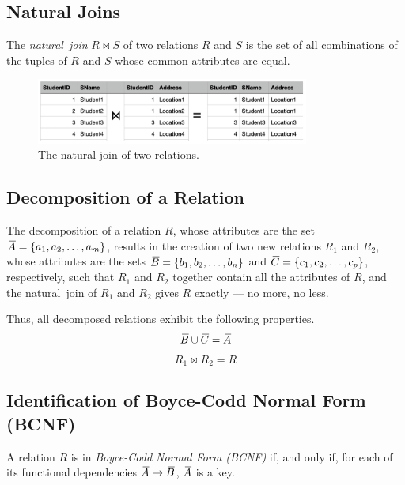 \subsection{Natural Joins}

The \emph{natural~join} \( R \bowtie S \) of two relations \( R \) and \( S \) is the set of all combinations of the tuples of \( R \) and \( S \) whose common attributes are equal.

\begin{figure}[htp]
  \centering
  \includegraphics[width=0.8\textwidth]{unit-3/figures/natural-join.jpg}
  \caption*{The natural join of two relations.}
\end{figure}

\subsection{Decomposition of a Relation}

The decomposition of a relation \( R \), whose attributes are the set \( {}\mkern3mu\overline{\mkern-3muA} = \left\{ a_1, a_2, \ldots, a_m \right\} \), results in the creation of two new relations \( R_1 \) and \( R_2 \), whose attributes are the sets \( {}\mkern3mu\overline{\mkern-3muB} = \left\{ b_1, b_2, \ldots, b_n \right\} \) and \( {}\mkern3mu\overline{\mkern-3muC} = \left\{ c_1, c_2, \ldots, c_p \right\} \), respectively, such that \( R_1 \) and \( R_2 \) together contain all the attributes of \( R \), and the natural~join of \( R_1 \) and \( R_2 \) gives \( R \) exactly --- no more, no less.

Thus, all decomposed relations exhibit the following properties.
\begin{equation*}
  {}\mkern3mu\overline{\mkern-3muB} \cup {}\mkern3mu\overline{\mkern-3muC} = {}\mkern3mu\overline{\mkern-3muA}
\end{equation*}
\begin{equation*}
  R_1 \bowtie R_2 = R
\end{equation*}

\subsection{Identification of Boyce-Codd Normal Form (BCNF)}

A relation \( R \) is in \emph{Boyce-Codd Normal Form (BCNF)} if, and only if, for each of its functional dependencies \( {}\mkern3mu\overline{\mkern-3muA} \rightarrow {}\mkern3mu\overline{\mkern-3muB} \), \( {}\mkern3mu\overline{\mkern-3muA} \) is a key.

